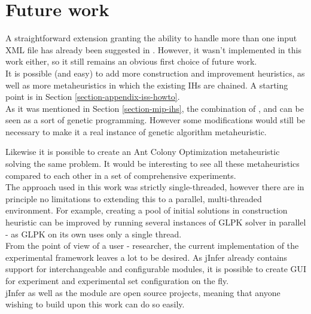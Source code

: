 \chapter{Future work}

A straightforward extension granting the ability to handle more than one input XML file has already been suggested in \cite{fidax}. However, it wasn't implemented in this work either, so it still remains an obvious first choice of future work.\\

It is possible (and easy) to add more construction and improvement heuristics, as well as more metaheuristics in which the existing IHs are chained. A starting point is in Section \ref{section-appendix-iss-howto}.\\

As it was mentioned in Section \ref{section-mip-ihs}, the combination of ,  and  can be seen as a sort of genetic programming. However some modifications would still be necessary to make it a real instance of genetic algorithm metaheuristic.

Likewise it is possible to create an Ant Colony Optimization metaheuristic solving the same problem. It would be interesting to see all these metaheuristics compared to each other in a set of comprehensive experiments.\\

The approach used in this work was strictly single-threaded, however there are in principle no limitations to extending this to a parallel, multi-threaded environment. For example, creating a pool of initial solutions in  construction heuristic can be improved by running several instances of GLPK solver in parallel - as GLPK on its own uses only a single thread.\\

From the point of view of a user - researcher, the current implementation of the experimental framework leaves a lot to be desired. As jInfer already contains support for interchangeable and configurable modules, it is possible to create GUI for experiment and experimental set configuration on the fly.\\

jInfer as well as the  module are open source projects, meaning that anyone wishing to build upon this work can do so easily.
